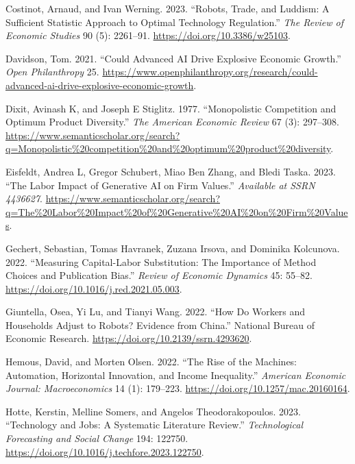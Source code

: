 \documentclass[
  11pt,
  letterpaper,
  DIV=11,
  numbers=noendperiod,
  oneside]{scrartcl}
\newlength{\cslhangindent}
\newenvironment{CSLReferences}[2] %
 {\begin{list}{}{%
  \setlength{\itemindent}{0pt}
  \setlength{\leftmargin}{0pt}
  \setlength{\parsep}{0pt}
  \ifodd #1
   \setlength{\leftmargin}{\cslhangindent}
   \setlength{\itemindent}{-1\cslhangindent}
  \fi
  \setlength{\itemsep}{#2\baselineskip}}}
 {\end{list}}
\begin{document}
\begin{CSLReferences}{1}{0}
Costinot, Arnaud, and Ivan Werning. 2023. {``Robots, Trade, and Luddism:
A Sufficient Statistic Approach to Optimal Technology Regulation.''}
\emph{The Review of Economic Studies} 90 (5): 2261--91.
\url{https://doi.org/10.3386/w25103}.

Davidson, Tom. 2021. {``Could Advanced AI Drive Explosive Economic
Growth.''} \emph{Open Philanthropy} 25.
\url{https://www.openphilanthropy.org/research/could-advanced-ai-drive-explosive-economic-growth}.

Dixit, Avinash K, and Joseph E Stiglitz. 1977. {``Monopolistic
Competition and Optimum Product Diversity.''} \emph{The American
Economic Review} 67 (3): 297--308.
\url{https://www.semanticscholar.org/search?q=Monopolistic\%20competition\%20and\%20optimum\%20product\%20diversity}.

Eisfeldt, Andrea L, Gregor Schubert, Miao Ben Zhang, and Bledi Taska.
2023. {``The Labor Impact of Generative AI on Firm Values.''}
\emph{Available at SSRN 4436627}.
\url{https://www.semanticscholar.org/search?q=The\%20Labor\%20Impact\%20of\%20Generative\%20AI\%20on\%20Firm\%20Values}.

Gechert, Sebastian, Tomas Havranek, Zuzana Irsova, and Dominika
Kolcunova. 2022. {``Measuring Capital-Labor Substitution: The Importance
of Method Choices and Publication Bias.''} \emph{Review of Economic
Dynamics} 45: 55--82. \url{https://doi.org/10.1016/j.red.2021.05.003}.

Giuntella, Osea, Yi Lu, and Tianyi Wang. 2022. {``How Do Workers and
Households Adjust to Robots? Evidence from China.''} National Bureau of
Economic Research. \url{https://doi.org/10.2139/ssrn.4293620}.

Hemous, David, and Morten Olsen. 2022. {``The Rise of the Machines:
Automation, Horizontal Innovation, and Income Inequality.''}
\emph{American Economic Journal: Macroeconomics} 14 (1): 179--223.
\url{https://doi.org/10.1257/mac.20160164}.

Hotte, Kerstin, Melline Somers, and Angelos Theodorakopoulos. 2023.
{``Technology and Jobs: A Systematic Literature Review.''}
\emph{Technological Forecasting and Social Change} 194: 122750.
\url{https://doi.org/10.1016/j.techfore.2023.122750}.


\end{CSLReferences}
\end{document}
